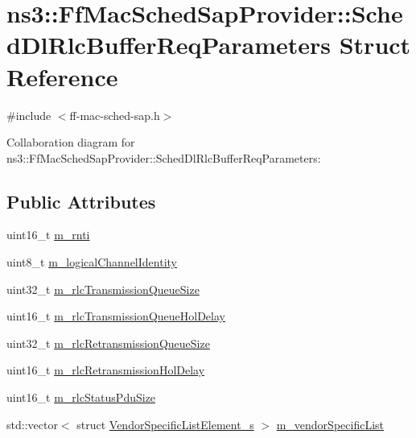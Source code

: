 \hypertarget{structns3_1_1FfMacSchedSapProvider_1_1SchedDlRlcBufferReqParameters}{}\section{ns3\+:\+:Ff\+Mac\+Sched\+Sap\+Provider\+:\+:Sched\+Dl\+Rlc\+Buffer\+Req\+Parameters Struct Reference}
\label{structns3_1_1FfMacSchedSapProvider_1_1SchedDlRlcBufferReqParameters}


{\ttfamily \#include $<$ff-\/mac-\/sched-\/sap.\+h$>$}



Collaboration diagram for ns3\+:\+:Ff\+Mac\+Sched\+Sap\+Provider\+:\+:Sched\+Dl\+Rlc\+Buffer\+Req\+Parameters\+:
\subsection*{Public Attributes}
\begin{DoxyCompactItemize}
\item 
uint16\+\_\+t \hyperlink{structns3_1_1FfMacSchedSapProvider_1_1SchedDlRlcBufferReqParameters_ac8ebe35f9f5f6f1a001e7ff5ffb4186b}{m\+\_\+rnti}
\item 
uint8\+\_\+t \hyperlink{structns3_1_1FfMacSchedSapProvider_1_1SchedDlRlcBufferReqParameters_a00dea23a2967d24a549f1a26c9d80326}{m\+\_\+logical\+Channel\+Identity}
\item 
uint32\+\_\+t \hyperlink{structns3_1_1FfMacSchedSapProvider_1_1SchedDlRlcBufferReqParameters_aa7ebd83b9a4b34b2323aa8eec42d36e4}{m\+\_\+rlc\+Transmission\+Queue\+Size}
\item 
uint16\+\_\+t \hyperlink{structns3_1_1FfMacSchedSapProvider_1_1SchedDlRlcBufferReqParameters_aa4586caa0fb5eef7526c6a5c0f1846eb}{m\+\_\+rlc\+Transmission\+Queue\+Hol\+Delay}
\item 
uint32\+\_\+t \hyperlink{structns3_1_1FfMacSchedSapProvider_1_1SchedDlRlcBufferReqParameters_a4d530aad1526698943534ed391cdf5c7}{m\+\_\+rlc\+Retransmission\+Queue\+Size}
\item 
uint16\+\_\+t \hyperlink{structns3_1_1FfMacSchedSapProvider_1_1SchedDlRlcBufferReqParameters_a38ee4002e431df924a7cda63625a969b}{m\+\_\+rlc\+Retransmission\+Hol\+Delay}
\item 
uint16\+\_\+t \hyperlink{structns3_1_1FfMacSchedSapProvider_1_1SchedDlRlcBufferReqParameters_a50b5fd802ba38d9936b7725d219961db}{m\+\_\+rlc\+Status\+Pdu\+Size}
\item 
std\+::vector$<$ struct \hyperlink{structns3_1_1VendorSpecificListElement__s}{Vendor\+Specific\+List\+Element\+\_\+s} $>$ \hyperlink{structns3_1_1FfMacSchedSapProvider_1_1SchedDlRlcBufferReqParameters_a9bace922f37332f822a7ce7b54437b84}{m\+\_\+vendor\+Specific\+List}
\end{DoxyCompactItemize}


